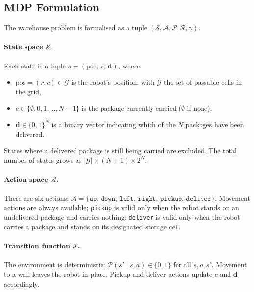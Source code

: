 \documentclass[a4paper,11pt]{article}
\newcommand{\states}{\ensuremath{\mathcal{S}}} %
\newcommand{\actions}{\ensuremath{\mathcal{A}}} %
\newcommand{\reward}{\ensuremath{\mathcal{R}}} %
\newcommand{\transition}{\ensuremath{\mathcal{P}}} %
\newcommand{\discount}{\ensuremath{\gamma}} %
\theoremstyle{definition}
\begin{document}
\subsection{MDP Formulation}

The warehouse problem is formalised as a tuple $(\states, \actions, \transition, \reward, \discount)$.

\paragraph{State space $\states$.}
Each state is a tuple $s = (\text{pos},\, c,\, \mathbf{d})$, where:
\begin{itemize}
    \item $\text{pos} = (r, c) \in \mathcal{G}$ is the robot's position, with $\mathcal{G}$ the set of passable cells in the grid,
    \item $c \in \{\emptyset, 0, 1, \ldots, N{-}1\}$ is the package currently carried ($\emptyset$ if none),
    \item $\mathbf{d} \in \{0,1\}^N$ is a binary vector indicating which of the $N$ packages have been delivered.
\end{itemize}
States where a delivered package is still being carried are excluded. The total number of states grows as $|\mathcal{G}| \times (N+1) \times 2^N$.

\paragraph{Action space $\actions$.}
There are six actions: $\actions = \{\texttt{up},\, \texttt{down},\, \texttt{left},\, \texttt{right},\, \texttt{pickup},\, \texttt{deliver}\}$. Movement actions are always available; \texttt{pickup} is valid only when the robot stands on an undelivered package and carries nothing; \texttt{deliver} is valid only when the robot carries a package and stands on its designated storage cell.

\paragraph{Transition function $\transition$.}
The environment is deterministic: $\transition(s' \mid s, a) \in \{0, 1\}$ for all $s, a, s'$. Movement to a wall leaves the robot in place. Pickup and deliver actions update $c$ and $\mathbf{d}$ accordingly.
\end{document}

